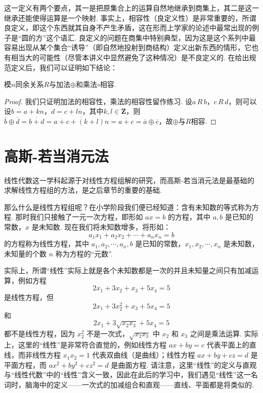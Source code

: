 这一定义有两个要点，其一是把原集合上的运算自然地继承到商集上，其二是这一继承还能使得运算是一个映射. 事实上，相容性（良定义性）是非常重要的，所谓良定义，即这个东西就其自身不产生矛盾，这在形而上学家的论述中最常出现的例子是``圆的方''这个语汇. 良定义的问题在商集中特别典型，因为这是这个系列中最容易出现从某个集合``诱导''（即自然地投射到商结构）定义出新东西的情形，它也有相当大的可能性（尽管本讲义中显然避免了这种情况）是不良定义的. 在给出规范定义后，我们可以证明如下结论：

\begin{theorem}{}{}
    模$n$同余关系$R$与加法$\oplus$和乘法$\circ$相容.
\end{theorem}
\begin{proof}
    我们只证明加法的相容性，乘法的相容性留作练习. 设$a\,R\,b$，$c\,R\,d$，则可以设$b=a+kn$，$d=c+ln$，其中$k,l\in\mathbf{Z}$，则$\overline{b}\oplus\overline{d}=\overline{b+d}=\overline{a+c+(k+l)n}=\overline{a+c}=\overline{a}\oplus\overline{c}$，故$\oplus$与$R$相容.
\end{proof}

\section{高斯-若当消元法}

线性代数这一学科起源于对线性方程组解的研究，而高斯-若当消元法是最基础的求解线性方程组的方法，是之后章节的重要的基础.

那么什么是线性方程组呢？在小学阶段我们便已经知道：含有未知数的等式称为方程. 那时我们只接触了一元一次方程，即形如 $ax = b$ 的方程，其中 $a, b$ 是已知的常数，$x$ 是未知数. 现在我们将未知数增多，将形如：
\[a_1x_1 + a_2x_2 + \cdots + a_nx_n = b\]
的方程称为线性方程，其中 $a_1, a_2, \cdots, a_n, b$ 是已知的常数，$x_1, x_2, \cdots, x_n$ 是未知数，未知量的个数 $n$ 称为方程的``元数''.

实际上，所谓``线性''实际上就是各个未知数都是一次的并且未知量之间只有加减运算，例如方程
\[2x_1 + 3x_2 + x_3 +5x_4 = 5\]
是线性方程，但
\[2x_1 + 3x_2^2 + x_3 + 5x_4 = 5\]
和
\[2x_1 + 3\sqrt{x_2x_3} + 5x_4 = 5\]
都不是线性方程，因为 $x_2^2$ 不是一次式，$\sqrt{x_2x_3}$ 中 $x_2$ 和 $x_3$ 之间是乘法运算. 实际上，这里的``线性''是非常符合直觉的，例如线性方程 $ax + by = c$ 代表平面上的直线，而非线性方程 $x_1x_2 = 1$ 代表双曲线（是曲线）；线性方程 $ax + by + cz = d$ 是平面方程，而 $ax^2 + by^2 +cz^2 = d$ 是曲面方程. 请注意，这里``线性''的定义与直观与``线性代数''中的``线性''含义一致，因此在此后的学习中，我们遇见``线性''这一名词时，脑海中的定义——一次式的加减组合和直观——直线、平面都是将类似的.

